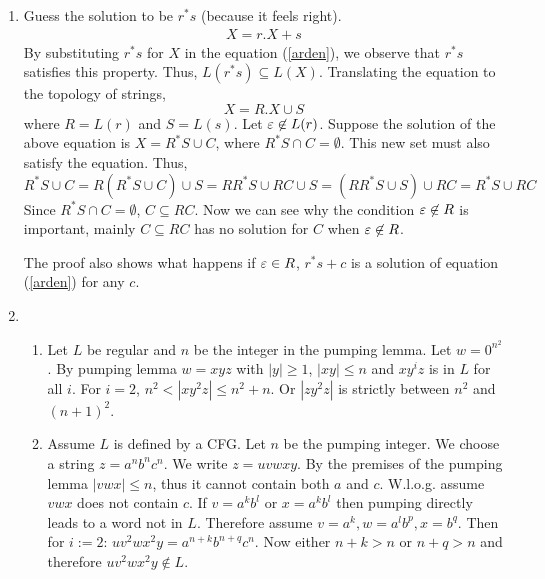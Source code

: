 \begin{solution}
  \begin{enumerate}
    \item Guess the solution to be  $r^*s$ (because it feels right).
      \begin{align}\label{arden}
        X = r.X + s\tag{$\star$}
      \end{align}
      By substituting $r^*s$ for $X$ in the equation (\ref{arden}), we observe that $r^*s$ satisfies this property.
      Thus, $L(r^*s)\subseteq L(X)$.
      Translating the equation to the topology of strings,
      \[X = R.X \cup S\]
      where $R=L(r)$ and $S = L(s)$. Let $\varepsilon \not\in L(r)$.
      Suppose the solution of the above equation is $X= R^*S \cup C$, where $R^*S \cap C = \emptyset$. This new set must also satisfy the equation.
      Thus,
      $$R^*S \cup C = R (R^*S \cup C) \cup S = RR^*S \cup RC \cup S = (RR^*S \cup S) \cup RC = R^* S \cup RC$$
      Since $R^*S \cap C = \emptyset$,  $C\subseteq RC$.
      Now we can see why the condition $\varepsilon \not\in R$ is important, mainly $C\subseteq RC$ has no solution for $C$ when $\varepsilon \not\in R$.

      The proof also shows what happens if $\varepsilon \in R$,  $r^*s + c$ is a solution of equation (\ref{arden}) for any $c$.

    \item
      \begin{enumerate}
        \item Let $L$ be regular and $n$ be the integer in the pumping lemma.
          Let $w = 0^{n^2}$. By pumping lemma $w = xyz$ with $|y|\ge 1$, $|xy|\le n$ and $xy^iz$ is in $L$ for all $i$.
          For $i=2$, $n^2 < |xy^2z| \le n^2 + n$. Or $|zy^2z|$ is strictly  between $n^2$ and $(n+1)^2$.
        \item Assume $L$ is defined by a CFG.
          Let $n$ be the pumping integer. We choose a string $z= a^nb^nc^n$. We write $z = uvwxy$.
          By the premises of the pumping lemma $|vwx|\le n$, thus it cannot contain both $a$ and $c$.
          W.l.o.g. assume $vwx$ does not contain $c$.
          If $v=a^kb^l$ or $x=a^kb^l$ then pumping directly leads to a word not in $L$.
          Therefore assume $v=a^k, w=a^lb^p, x=b^q$.
          Then for $i := 2$: $uv^2wx^2y = a^{n+k}b^{n+q}c^n$. Now either $n+k>n$ or $n+q>n$ and therefore $uv^2wx^2y \not \in L$.
      \end{enumerate}
  \end{enumerate}
\end{solution}
